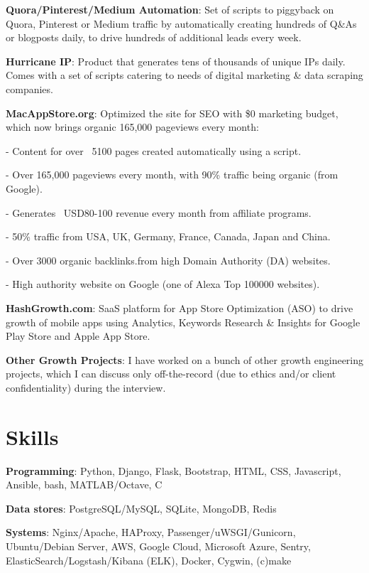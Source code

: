 \documentclass[overlapped,centered]{resume}
\begin{document}
\begin{resume}
\begin{list2}
	\item \textbf{Quora/Pinterest/Medium Automation}: Set of scripts to piggyback on Quora, Pinterest or Medium traffic by automatically creating hundreds of Q\&As or blogposts daily, to drive hundreds of additional leads every week.
	
	\item \textbf{Hurricane IP}: Product that generates tens of thousands of unique IPs daily. Comes with a set of scripts catering to needs of digital marketing \& data scraping companies.
	
	\item \textbf{MacAppStore.org}: Optimized the site for SEO with \$0 marketing budget, which now brings organic 165,000 pageviews every month:

	\setlength{\leftskip}{15pt}
	
		- Content for over ~5100 pages created automatically using a script. 
	
		- Over 165,000 pageviews every month, with 90\% traffic being organic (from Google).
		
		- Generates ~USD80-100 revenue every month from affiliate programs.
	
		- 50\% traffic from USA, UK, Germany, France, Canada, Japan and China.
	
		- Over 3000 organic backlinks.from high Domain Authority (DA) websites.
	
		- High authority website on Google (one of Alexa Top 100000 websites).
	
	\setlength{\leftskip}{0pt}
	
	\item \textbf{HashGrowth.com}: SaaS platform for App Store Optimization (ASO) to drive growth of mobile apps using Analytics, Keywords Research \& Insights for Google Play Store and Apple App Store.
	
	\item \textbf{Other Growth Projects}: I have worked on a bunch of other growth engineering projects, which I can discuss only off-the-record (due to ethics and/or client confidentiality) during the interview.
	
	\end{list2}
	
    \section{\mysidestyle Skills} 

    \begin{list2}
	\item \textbf{Programming}: Python, Django, Flask, Bootstrap, HTML, CSS, Javascript, Ansible, bash, MATLAB/Octave, C
	\item \textbf{Data stores}: PostgreSQL/MySQL, SQLite,	MongoDB, Redis
	\item \textbf{Systems}: Nginx/Apache, HAProxy, Passenger/uWSGI/Gunicorn, Ubuntu/Debian Server, AWS, Google Cloud, Microsoft Azure, Sentry, ElasticSearch/Logstash/Kibana (ELK), Docker, Cygwin, (c)make
	\end{list2}


\end{resume}
\end{document}

